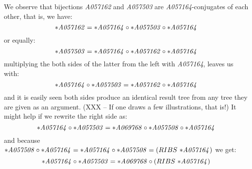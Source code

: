 \documentclass[11pt]{article} %
\newcommand{\eeq}{\end{equation}}
\newcommand{\beql}[1]{\begin{equation}\label{#1}}
\newcommand{\autname}[1]{{\it *#1}}
\newcommand{\funapply}{\ensuremath{\circ}}
\begin{document}
We observe that bijections \autname{A057162} and \autname{A057503}
are \autname{A057164}-conjugates of each other, that is, we have:
\beql{A057162_as_A057164_conjugate_of_A057503}
\autname{A057162} = \autname{A057164}\funapply\autname{A057503}\funapply\autname{A057164}
\eeq
or equally:
\beql{A057503_as_A057164_conjugate_of_A057162}
\autname{A057503} = \autname{A057164}\funapply\autname{A057162}\funapply\autname{A057164}
\eeq
multiplying the both sides of the latter from the left with \autname{A057164},
leaves us with:
\beql{A057164_o_A057503_equal_to_A057162_o_A057164}
\autname{A057164}\funapply\autname{A057503} = \autname{A057162}\funapply\autname{A057164}
\eeq
and it is easily seen both sides produce an identical result tree
from any tree they are given as an argument. (XXX -- If one draws a few illustrations, that is!)
It might help if we rewrite the right side as:
\beql{A057164_o_A057503_equal_to_A069768_o_A057508_o_A057164}
\autname{A057164}\funapply\autname{A057503} = \autname{A069768}\funapply\autname{A057508}\funapply\autname{A057164}
\eeq
and because $\autname{A057508}\funapply\autname{A057164} = \autname{A057164}\funapply\autname{A057508} = (RIBS~\autname{A057164})$
we get:
\beql{A057164_o_A057503_equal_to_A069768_o_RIBS_A057164}
\autname{A057164}\funapply\autname{A057503} = \autname{A069768}\funapply(RIBS~\autname{A057164})
\eeq
\end{document}
